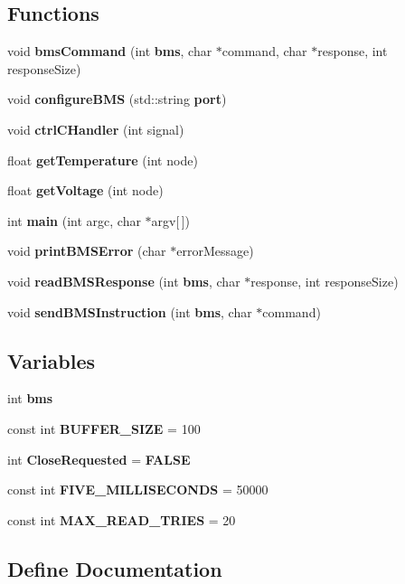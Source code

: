 \subsection*{\-Functions}
\begin{DoxyCompactItemize}
\item 
void {\bf bms\-Command} (int {\bf bms}, char $\ast$command, char $\ast$response, int response\-Size)
\item 
void {\bf configure\-B\-M\-S} (std\-::string {\bf port})
\item 
void {\bf ctrl\-C\-Handler} (int signal)
\item 
float {\bf get\-Temperature} (int node)
\item 
float {\bf get\-Voltage} (int node)
\item 
int {\bf main} (int argc, char $\ast$argv[$\,$])
\item 
void {\bf print\-B\-M\-S\-Error} (char $\ast$error\-Message)
\item 
void {\bf read\-B\-M\-S\-Response} (int {\bf bms}, char $\ast$response, int response\-Size)
\item 
void {\bf send\-B\-M\-S\-Instruction} (int {\bf bms}, char $\ast$command)
\end{DoxyCompactItemize}
\subsection*{\-Variables}
\begin{DoxyCompactItemize}
\item 
int {\bf bms}
\item 
const int {\bf \-B\-U\-F\-F\-E\-R\-\_\-\-S\-I\-Z\-E} = 100
\item 
int {\bf \-Close\-Requested} = {\bf \-F\-A\-L\-S\-E}
\item 
const int {\bf \-F\-I\-V\-E\-\_\-\-M\-I\-L\-L\-I\-S\-E\-C\-O\-N\-D\-S} = 50000
\item 
const int {\bf \-M\-A\-X\-\_\-\-R\-E\-A\-D\-\_\-\-T\-R\-I\-E\-S} = 20
\end{DoxyCompactItemize}


\subsection{\-Define \-Documentation}
